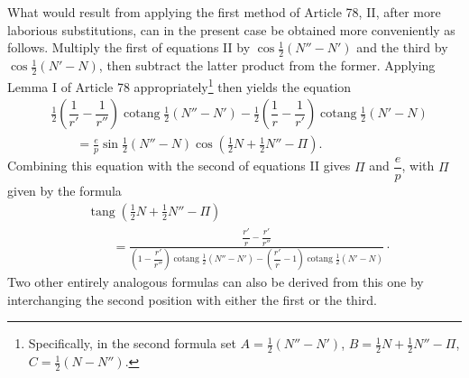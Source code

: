 What would result from applying the first method of Article 78, II, after more laborious substitutions, can in the present case be obtained more conveniently as follows. Multiply the first of equations II by $\cos\tfrac12(N''-N')$ and the third by $\cos\tfrac12(N'-N)$, then subtract the latter product from the former. Applying Lemma I of Article 78 appropriately\footnote{Specifically, in the second formula set $A=\tfrac12(N''-N')$, $B=\tfrac12N+\tfrac12N''-\Pi$, $C=\tfrac12(N-N'')$.} then yields the equation
\[
\begin{aligned}
&\tfrac12\left(\dfrac1{r'}-\dfrac1{r''}\right)\operatorname{cotang}\tfrac12(N''-N')-\tfrac12\left(\dfrac1r-\dfrac1{r'}\right)\operatorname{cotang}\tfrac12(N'-N)\\[4pt]
&\qquad=\frac{e}{p}\sin\tfrac12(N''-N)\cos(\tfrac12N+\tfrac12N''-\Pi).
\end{aligned}
\]
Combining this equation with the second of equations II gives $\Pi$ and $\dfrac{e}{p}$, with $\Pi$ given by the formula
\[
\begin{aligned}
&\operatorname{tang}(\tfrac12N+\tfrac12N''-\Pi)\\[4pt]
&\qquad=\frac{\dfrac{r'}r-\dfrac{r'}{r''}}{\left(1-\dfrac{r'}{r''}\right)\operatorname{cotang}\tfrac12(N''-N')-\left(\dfrac{r'}r-1\right)\operatorname{cotang}\tfrac12(N'-N)}\mathpunct{\cdot}
\end{aligned}
\]
Two other entirely analogous formulas can also be derived from this one by interchanging the second position with either the first or the third.
